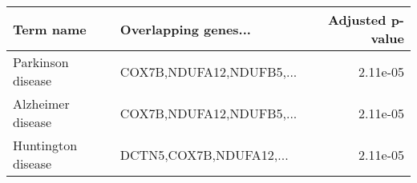\begin{tabular}{llr}
\toprule
         Term name &     Overlapping genes... &  Adjusted p-value \\
\midrule
 Parkinson disease & COX7B,NDUFA12,NDUFB5,... &          2.11e-05 \\
 Alzheimer disease & COX7B,NDUFA12,NDUFB5,... &          2.11e-05 \\
Huntington disease &  DCTN5,COX7B,NDUFA12,... &          2.11e-05 \\
\bottomrule
\end{tabular}
